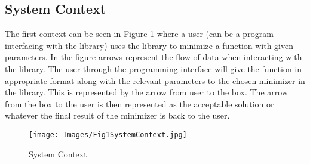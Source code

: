 \documentclass[12pt]{article}
\begin{document}
\subsection{System Context}
The first context can be seen in Figure \ref{img:FigureSystemContext} where a user (can be a program interfacing with the library) uses the library to minimize a function with given parameters. In the figure arrows represent the flow of data when interacting with the library. The user through the programming interface will give the function in appropriate format along with the relevant parameters to the chosen minimizer in the library. This is represented by the arrow from user to the box. The arrow from the box to the user is then represented as the acceptable solution or whatever the final result of the minimizer is back to the user. 
\\


\begin{figure}[h!]
\begin{center}
 \texttt{[image: Images/Fig1SystemContext.jpg]}
\caption{System Context}
\label{img:FigureSystemContext}
\end{center}
\end{figure}

\end{document}
